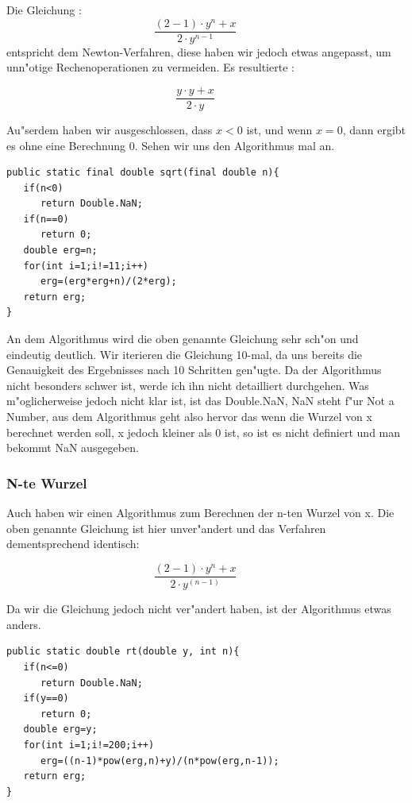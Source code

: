 \documentclass{scrartcl}
\begin{document}
Die Gleichung :
\begin{displaymath}
\frac{(2-1)\cdot y^n+x }{ 2 \cdot y^{n-1} } \qquad
\end{displaymath}
 entspricht dem Newton-Verfahren, diese haben wir jedoch etwas angepasst, um unn"otige Rechenoperationen zu vermeiden.
Es resultierte :\newline 

\begin{displaymath}
\frac{ y \cdot y + x}{2 \cdot y } \qquad
\end{displaymath}

Au"serdem haben wir ausgeschlossen, dass \(x < 0\) ist, und wenn \(x = 0\), dann ergibt es ohne eine Berechnung 0.\newline
Sehen wir uns den Algorithmus mal an.\newline
\begin{minipage}{\textwidth}
\begin{lstlisting}
public static final double sqrt(final double n){
   if(n<0)
      return Double.NaN;
   if(n==0)
      return 0;
   double erg=n;
   for(int i=1;i!=11;i++)
      erg=(erg*erg+n)/(2*erg);
   return erg;        
}
\end{lstlisting}
\end{minipage}

An dem Algorithmus wird die oben genannte Gleichung sehr sch"on und eindeutig deutlich. Wir iterieren die Gleichung 10-mal, da uns bereits die Genauigkeit des Ergebnisses nach 10 Schritten gen"ugte. Da der Algorithmus nicht besonders schwer ist, werde ich ihn nicht detailliert durchgehen. Was m"oglicherweise jedoch nicht klar ist, ist das \glqq Double.NaN\grqq, NaN steht f"ur Not a Number, aus dem Algorithmus geht also hervor das wenn die Wurzel von x berechnet werden soll, x jedoch kleiner als 0 ist, so ist es nicht definiert und man bekommt NaN ausgegeben.\newline
\subsubsection{N-te Wurzel}
Auch haben wir einen Algorithmus zum Berechnen der n-ten Wurzel von x. Die oben genannte Gleichung ist hier unver"andert und das Verfahren dementsprechend identisch:

\begin{displaymath}
\frac{(2-1) \cdot y^n+x}{2 \cdot y^{(n-1)}} \qquad
\end{displaymath}

Da wir die Gleichung jedoch nicht ver"andert haben, ist der Algorithmus etwas anders.\newline
\begin{minipage}{\textwidth}
\begin{lstlisting}
public static double rt(double y, int n){
   if(n<=0)
      return Double.NaN;
   if(y==0)
      return 0;
   double erg=y;
   for(int i=1;i!=200;i++)
      erg=((n-1)*pow(erg,n)+y)/(n*pow(erg,n-1));
   return erg;
}
\end{lstlisting}
\end{minipage}
\end{document}
